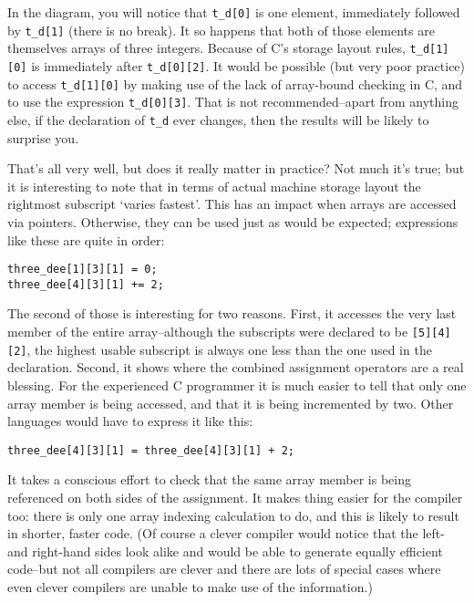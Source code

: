    In the diagram, you will notice that \texttt{t\_d[0]} is one
    element, immediately followed by \texttt{t\_d[1]} (there is no
    break).  It so happens that both of those elements are themselves arrays
    of three integers. Because of C's storage layout rules,
    \texttt{t\_d[1][0]} is immediately after \texttt{t\_d[0][2]}. It
    would be possible (but very poor practice) to access
    \texttt{t\_d[1][0]} by making use of the lack of array-bound checking
    in C, and to use the expression \texttt{t\_d[0][3]}. That is not
    recommended--apart from anything else, if the declaration of
    \texttt{t\_d} ever changes, then the results will be likely to
    surprise you.


   That's all very well, but does it really matter in practice? Not much
    it's true; but it is interesting to note that in terms of actual machine
    storage layout the rightmost subscript `varies fastest'. This has
    an impact when arrays are accessed via pointers. Otherwise, they can be
    used just as would be expected; expressions like these are quite in
    order:


   \begin{Verbatim}
three_dee[1][3][1] = 0;
three_dee[4][3][1] += 2;
\end{Verbatim}

   The second of those is interesting for two reasons. First, it accesses
    the very last member of the entire array--although the subscripts
    were declared to be \texttt{[5][4][2]}, the highest usable subscript
    is always one less than the one used in the declaration. Second, it
    shows where the combined assignment operators are a real blessing. For
    the experienced C programmer it is much easier to tell that only one
    array member is being accessed, and that it is being incremented by two.
    Other languages would have to express it like this:


   \begin{Verbatim}
three_dee[4][3][1] = three_dee[4][3][1] + 2;
\end{Verbatim}

   It takes a conscious effort to check that the same array member is
    being referenced on both sides of the assignment. It makes thing easier
    for the compiler too: there is only one array indexing calculation to
    do, and this is likely to result in shorter, faster code. (Of course
    a clever compiler would notice that the left- and right-hand sides look
    alike and would be able to generate equally efficient code--but not
    all compilers are clever and there are lots of special cases where even
    clever compilers are unable to make use of the information.)


